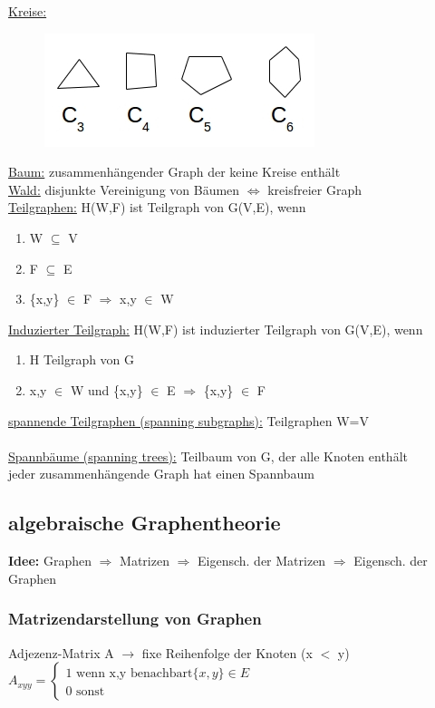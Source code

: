 \underline{Kreise:}
\begin{figure}[htp]
\centering
\includegraphics[scale=1]{lectures/161021/pix/pic10.jpg}
\end{figure}

\underline{Baum:} zusammenhängender Graph der keine Kreise enthält\\
\underline{Wald:} disjunkte Vereinigung von Bäumen $\Leftrightarrow$ kreisfreier Graph\\
\underline{Teilgraphen:} H(W,F) ist Teilgraph von G(V,E), wenn
\begin{enumerate}
	\item W $\subseteq$ V
	\item F $\subseteq$ E
	\item \{x,y\} $\in$ F $\Rightarrow$ x,y $\in$ W
\end{enumerate}

\underline{Induzierter Teilgraph:} H(W,F) ist induzierter Teilgraph von G(V,E), wenn
\begin{enumerate}
	\item H Teilgraph von G
	\item x,y $\in$ W und \{x,y\} $\in$ E $\Rightarrow$ \{x,y\} $\in$ F
\end{enumerate}

\underline{spannende Teilgraphen (spanning subgraphs):} Teilgraphen W=V
\\\\
\underline{Spannbäume (spanning trees):} Teilbaum von G, der alle Knoten enthält\\
jeder zusammenhängende Graph hat einen Spannbaum

\subsection{algebraische Graphentheorie}
\textbf{Idee:} Graphen $\Rightarrow$ Matrizen $\Rightarrow$ Eigensch. der Matrizen $\Rightarrow$ Eigensch. der Graphen
\subsubsection{Matrizendarstellung von Graphen}
Adjezenz-Matrix A $\rightarrow$ fixe Reihenfolge der Knoten (x $<$ y)\\
$A_{xyy}=
	\begin{cases}
		\text{1 wenn x,y benachbart} \{x,y\} \in E\\
		\text{0 sonst}
	\end{cases}
$

